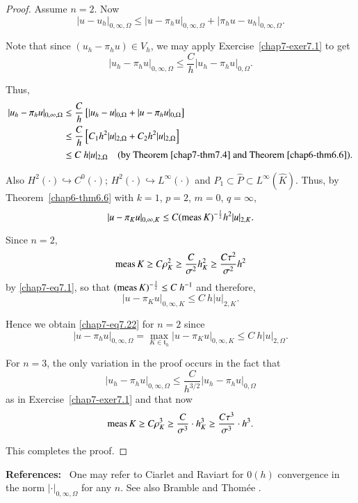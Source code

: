 \begin{proof}
Assume $n=2$. Now
\begin{equation*}
|u-u_{h}|_{0,\infty,\Omega}\leq
|u-\pi_{h}u|_{0,\infty,\Omega}+|\pi_{h}u-u_{h}|_{0,\infty,\Omega}.\tag{7.23}\label{chap7-eq7.23} 
\end{equation*}

Note that since $(u_{h}-\pi_{h}u)\in V_{h}$, we may apply
Exercise~\ref{chap7-exer7.1} to get
\begin{equation*}
|u_{h}-\pi_{h}u|_{0,\infty,\Omega}\leq
\frac{C}{h}|u_{h}-\pi_{h}u|_{0,\Omega}.\tag{7.24}\label{chap7-eq7.24} 
\end{equation*}

Thus,
\begin{align*}
|u_{h}-\pi_{h}u|_{0,\infty,\Omega} &\leq
\frac{C}{h}\left[|u_{h}-u|_{0,\Omega}+|u-\pi_{h}u|_{0,\Omega}\right]\\ 
&\leq
\frac{C}{h}\left[C_{1}h^{2}|u|_{2,\Omega}+C_{2}h^{2}|u|_{2,\Omega}\right]\\
&\leq C\ h|u|_{2,\Omega}\quad\text{(by Theorem~\ref{chap7-thm7.4} and
  Theorem~\ref{chap6-thm6.6}).} 
\end{align*}

Also $H^{2}(\cdot)\hookrightarrow C^{0}(\cdot)$;
$H^{2}(\cdot)\hookrightarrow L^{\infty}(\cdot)$ and $P_{1}\subset
\hat{P}\subset L^{\infty}(\hat{K})$. Thus, by
Theorem~\ref{chap6-thm6.6} with $k=1$, $p=2$, $m=0$, $q=\infty$,
$$
|u-\pi_{K}u|_{0,\infty,K}\leq C(\operatorname{meas} K)^{-\frac{1}{2}}h^{2}|u|_{2,K}.
$$

Since $n=2$,
$$
\operatorname{meas} K\geq C\rho^{2}_{K}\geq \frac{C}{\sigma^{2}}h^{2}_{K}\geq
\frac{C\tau^{2}}{\sigma^{2}}h^{2} 
$$
by \eqref{chap7-eq7.1}, so that $(\operatorname{meas} K)^{-\frac{1}{2}}\leq
C\ h^{-1}$ and therefore,
$$
|u-\pi_{K}u|_{0,\infty,K}\leq C\ h|u|_{2,K}.
$$

Hence we obtain \eqref{chap7-eq7.22} for $n=2$ since 
$$
|u-\pi_{h}u|_{0,\infty,\Omega}=\max\limits_{K\in
  \mathfrak{t}_{h}}|u-\pi_{K}u|_{0,\infty,K}\leq C\ h|u|_{2,\Omega}.
$$\pageoriginale

For $n=3$, the only variation in the proof occurs in the fact that
$$
|u_{h}-\pi_{h}u|_{0,\infty,\Omega}\leq
\frac{C}{h^{3/2}}|u_{h}-\pi_{h}u|_{0,\Omega} 
$$
as in Exercise~\ref{chap7-exer7.1} and that now
$$
\operatorname{meas} K\geq C\rho^{3}_{K}\geq \frac{C}{\sigma^{3}}\cdot h^{3}_{K}\geq
\frac{C\tau^{3}}{\sigma^{3}}\cdot h^{3}.
$$

This completes the proof.
\end{proof}

\noindent
{\bf References:}~ One may refer to Ciarlet and Raviart \cite{key6}
for $0(h)$ convergence in the norm $|\cdot|_{0,\infty,\Omega}$ for any
$n$. See also Bramble and Thom\'ee \cite{key1}.

